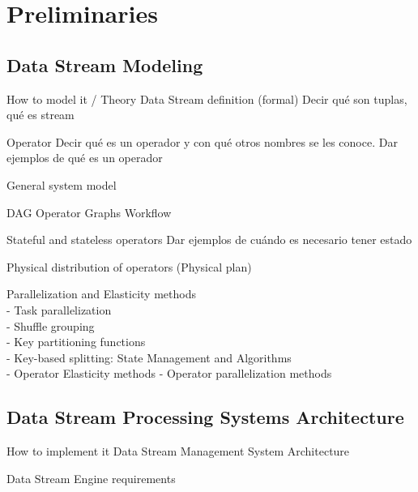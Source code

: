 \chapter{Preliminaries
  \label{chapter:preliminaries}}

  \section{Data Stream Modeling}
  How to model it / Theory
  Data Stream definition (formal) \cite{KottoKombi2015ParallelAD} \cite{kamburugamuve2013survey}\cite{R_ger_2019}
  Decir qué son tuplas, qué es stream

  Operator  \cite{kamburugamuve2013survey}
  Decir qué es un operador y con qué otros nombres se les conoce. Dar ejemplos de qué es un operador

  General system model

  DAG  \cite{kamburugamuve2013survey}
  Operator Graphs \cite{R_ger_2019}
  Workflow  \cite{KottoKombi2015ParallelAD}

  Stateful and stateless operators  \cite{KottoKombi2015ParallelAD}
  Dar ejemplos de cuándo es necesario tener estado

  Physical distribution of operators (Physical plan)  \cite{kamburugamuve2013survey}

  Parallelization and Elasticity methods \cite{R_ger_2019}\\
  - Task parallelization \cite{R_ger_2019}\\
  - Shuffle grouping \cite{R_ger_2019}\\
  - Key partitioning functions \cite{R_ger_2019}\\
  - Key-based splitting: State Management and Algorithms \cite{R_ger_2019}\\
  - Operator Elasticity methods \cite{R_ger_2019}
  - Operator parallelization methods \cite{R_ger_2019}

  \section{Data Stream Processing Systems Architecture}
  How to implement it
  Data Stream Management System Architecture\cite{chakravarthy2009stream}

  Data Stream Engine requirements  \cite{kamburugamuve2013survey}

